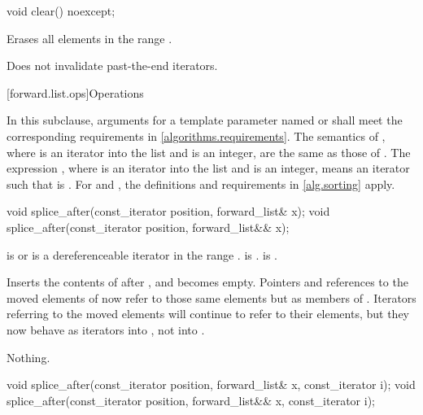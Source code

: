 %
\begin{itemdecl}
void clear() noexcept;
\end{itemdecl}

\begin{itemdescr}
\pnum
\effects
Erases all elements in the range .

\pnum
\remarks
Does not invalidate past-the-end iterators.
\end{itemdescr}

[forward.list.ops]{Operations}

\pnum
In this subclause,
arguments for a template parameter
named  or 
shall meet the corresponding requirements in \ref{algorithms.requirements}.
The semantics of ,
where  is an iterator into the list and  is an integer,
are the same as those of .
The expression ,
where  is an iterator into the list and  is an integer,
means an iterator  such that  is .
For  and ,
the definitions and requirements in \ref{alg.sorting} apply.

%
\begin{itemdecl}
void splice_after(const_iterator position, forward_list& x);
void splice_after(const_iterator position, forward_list&& x);
\end{itemdecl}

\begin{itemdescr}
\pnum
\expects
{} is  or is a dereferenceable
iterator in the range .
 is .
 is .

\pnum
\effects
Inserts the contents of  after
, and  becomes empty. Pointers and references to the moved
elements of  now refer to those same elements but as members of .
Iterators referring to the moved elements will continue to refer to their elements, but
they now behave as iterators into , not into .

\pnum
\throws
Nothing.

\pnum
\complexity
{}
\end{itemdescr}

%
\begin{itemdecl}
void splice_after(const_iterator position, forward_list& x, const_iterator i);
void splice_after(const_iterator position, forward_list&& x, const_iterator i);
\end{itemdecl}

